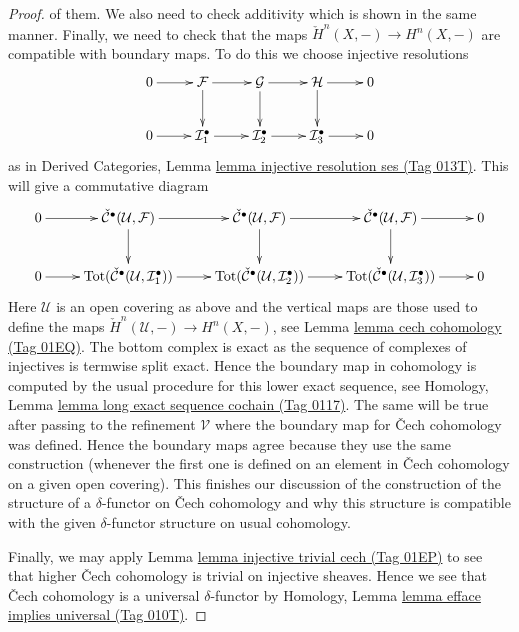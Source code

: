 \documentclass{amsart}
\theoremstyle{plain}
\theoremstyle{definition}
\theoremstyle{remark}
\numberwithin{equation}{subsection}
\begin{document}
\begin{proof}
of them. We also need to check additivity which is shown in the same manner.
Finally, we need to check that the maps
$\check{H}^n(X, -) \to H^n(X, -)$ are compatible
with boundary maps. To do this we choose injective
resolutions
$$
\xymatrix{
0 \ar[r] &
\mathcal{F} \ar[r] \ar[d] &
\mathcal{G} \ar[r] \ar[d] &
\mathcal{H} \ar[r] \ar[d] &
0 \\
0 \ar[r] &
\mathcal{I}_1^\bullet \ar[r] &
\mathcal{I}_2^\bullet \ar[r] &
\mathcal{I}_3^\bullet \ar[r] &
0
}
$$
as in Derived Categories, Lemma \href{https://stacks.math.columbia.edu/tag/013T}{lemma injective resolution ses (Tag 013T)}.
This will give a commutative diagram
$$
\xymatrix{
0 \ar[r] &
\check{\mathcal{C}}^\bullet(\mathcal{U}, \mathcal{F}) \ar[r] \ar[d] &
\check{\mathcal{C}}^\bullet(\mathcal{U}, \mathcal{F}) \ar[r] \ar[d] &
\check{\mathcal{C}}^\bullet(\mathcal{U}, \mathcal{F}) \ar[r] \ar[d] &
0 \\
0 \ar[r] &
\text{Tot}(\check{\mathcal{C}}^\bullet(\mathcal{U}, \mathcal{I}_1^\bullet))
\ar[r] &
\text{Tot}(\check{\mathcal{C}}^\bullet(\mathcal{U}, \mathcal{I}_2^\bullet))
\ar[r] &
\text{Tot}(\check{\mathcal{C}}^\bullet(\mathcal{U}, \mathcal{I}_3^\bullet))
\ar[r] &
0
}
$$
Here $\mathcal{U}$ is an open covering as above and
the vertical maps are those used to define the maps
$\check{H}^n(\mathcal{U}, -) \to H^n(X, -)$, see
Lemma \href{https://stacks.math.columbia.edu/tag/01EQ}{lemma cech cohomology (Tag 01EQ)}.
The bottom complex is exact as the sequence of
complexes of injectives is termwise split exact.
Hence the boundary map in cohomology is computed
by the usual procedure for this lower exact sequence, see
Homology, Lemma \href{https://stacks.math.columbia.edu/tag/0117}{lemma long exact sequence cochain (Tag 0117)}.
The same will be true after passing to the refinement
$\mathcal{V}$ where the boundary map for {\v C}ech cohomology
was defined. Hence the boundary maps agree because they
use the same construction (whenever the first one is defined
on an element in {\v C}ech cohomology on a given open covering).
This finishes our discussion of the construction of
the structure of a $\delta$-functor on {\v C}ech cohomology
and why this structure is compatible with the given
$\delta$-functor structure on usual cohomology.

\medskip\noindent
Finally, we may apply Lemma \href{https://stacks.math.columbia.edu/tag/01EP}{lemma injective trivial cech (Tag 01EP)}
to see that higher {\v C}ech cohomology is trivial on injective
sheaves. Hence we see that {\v C}ech cohomology is a universal
$\delta$-functor by
Homology, Lemma \href{https://stacks.math.columbia.edu/tag/010T}{lemma efface implies universal (Tag 010T)}.
\end{proof}
\end{document}
